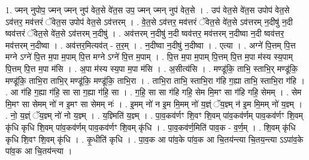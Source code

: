 \documentclass[17pt]{extarticle}
\begin{document}
1. ज्मन् नुपोप॒ ज्मन् ज्मन् नुप॑ वेत॒से वे॑त॒स उप॒ ज्मन् ज्मन् नुप॑ वेत॒से । . उप॑ वेत॒से वे॑त॒स उपोप॑ वेत॒से ऽव॑त्तर॒ मव॑त्तरं ॅवेत॒स उपोप॑ वेत॒से ऽव॑त्तरम् । . वे॒त॒से ऽव॑त्तर॒ मव॑त्तरं ॅवेत॒से वे॑त॒से ऽव॑त्तरम् न॒दीषु॑ न॒दी ष्वव॑त्तरं ॅवेत॒से वे॑त॒से ऽव॑त्तरम् न॒दीषु॑ । . अव॑त्तरम् न॒दीषु॑ न॒दी ष्वव॑त्तर॒ मव॑त्तरम् न॒दीष्वा न॒दी ष्वव॑त्तर॒ मव॑त्तरम् न॒दीष्वा । . अव॑त्तर॒मित्यव॑त् - त॒र॒म् । . न॒दीष्वा न॒दीषु॑ न॒दीष्वा । . एत्या । . अग्ने॑ पि॒त्तम् पि॒त्त मग्ने ऽग्ने॑ पि॒त्त म॒पा म॒पाम् पि॒त्त मग्ने ऽग्ने॑ पि॒त्त म॒पाम् । . पि॒त्त म॒पा म॒पाम् पि॒त्तम् पि॒त्त म॒पा म॑स्य स्य॒पाम् पि॒त्तम् पि॒त्त म॒पा म॑सि । . अ॒पा म॑स्य स्य॒पा म॒पा म॑सि । . अ॒सीत्य॑सि । . मण्डू॑कि॒ ताभि॒ स्ताभि॒र् मण्डू॑कि॒ मण्डू॑कि॒ ताभि॒रा ताभि॒र् मण्डू॑कि॒ मण्डू॑कि॒ ताभि॒रा । . ताभि॒रा ताभि॒ स्ताभि॒रा ग॑हि ग॒ह्या ताभि॒ स्ताभि॒रा ग॑हि । . आ ग॑हि ग॒ह्या ग॑हि॒ सा सा ग॒ह्या ग॑हि॒ सा । . ग॒हि॒ सा सा ग॑हि गहि॒ सेम मि॒मꣳ सा ग॑हि गहि॒ सेमम् । . सेम मि॒मꣳ सा सेमम् नो॑ न इ॒मꣳ सा सेमम् नः॑ । . इ॒मम् नो॑ न इ॒म मि॒मम् नो॑ य॒ज्ञ्ं ॅय॒ज्ञ्म् न॑ इ॒म मि॒मम् नो॑ य॒ज्ञ्म् । . नो॒ य॒ज्ञ्ं ॅय॒ज्ञ्म् नो॑ नो य॒ज्ञ्म् । . य॒ज्ञ्मिति॑ य॒ज्ञ्म् । . पा॒व॒कव॑र्णꣳ शि॒वꣳ शि॒वम् पा॑व॒कव॑र्णम् पाव॒कव॑र्णꣳ शि॒वम् कृ॑धि कृधि शि॒वम् पा॑व॒कव॑र्णम् पाव॒कव॑र्णꣳ शि॒वम् कृ॑धि । . पा॒व॒कव॑र्ण॒मिति॑ पाव॒क - व॒र्ण॒म् । . शि॒वम् कृ॑धि कृधि शि॒वꣳ शि॒वम् कृ॑धि । . कृ॒धीति॑ कृधि । . पा॒व॒क आ पा॑व॒के पा॑व॒क आ चि॒तय॑न्त्या चि॒तय॒न्त्या ऽऽपा॑व॒के पा॑व॒क आ चि॒तय॑न्त्या । \newline
\end{document}
